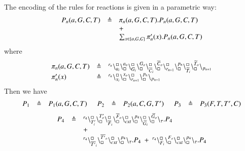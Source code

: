 The encoding of the rules for reactions is  given in a parametric way:
\[
\begin{array}{lcl}
P_n(a,G,C,T) & \triangleq &\pi_n(a,G,C,T).P_n(a,G,C,T)  \\
				&& +\\
			&&\sum_{x\in \{a,G,C\}} \pi'_n(x).P_n(a,G,C,T)
\end{array}
\]
where
\[
\begin{array}{lcl}
\pi_n(a,G,C,T) & \triangleq & {}^{r_n}\backslash_{a_i}^{\scriptstyle {\square}}\backslash_{\scriptstyle {\square}}^{a_o}
                                                    \backslash_{G_i}^{\scriptstyle {\square}}\backslash_{\scriptstyle {\square}}^{G_o}
                                                     \backslash_{\overline{C}_i}^{\scriptstyle {\square}}\backslash_{\scriptstyle {\square}}^{\overline{C}_o}
					        \backslash_{r_{n+1}}^{\scriptstyle {\square}}\backslash_{\scriptstyle {\square}}^{p_n}
					        \backslash_{\widetilde{T}_i}^{\scriptstyle {\square}}\backslash_{\scriptstyle {\square}}^{\widetilde{T}_o}
			\backslash_{p_{n+1}}\\
\pi'_n(x) &\triangleq &  {}^{r_n}\backslash_{x_i}^{\scriptstyle {\square}}\backslash_{\scriptstyle {\square}}^{x_o}\backslash_{r_{n+1}}^{\scriptstyle {\square}}\backslash_{\scriptstyle {\square}}^{p_n} \backslash_{p_{n+1}} 
\end{array}
\]
\noindent
Then we have 
\[
\begin{array}{lcl @{\hspace{0.5cm}}lcl @{\hspace{0.5cm}}lcl }
P_1 & \defeq & P_1(a,G,C,T) &   P_2 & \defeq & P_2(a,C,G,T') &   P_3 & \defeq & P_3(F,T,T',C)  \\
\end{array}
\]
\[
\begin{array}{lcl}
P_4 & \triangleq &{}^{r_4}\backslash_{T'_i}^{\scriptstyle {\square}}\backslash_{\scriptstyle {\square}}^{T'_o}
                                                     \backslash_{\overline{F}_i}^{\scriptstyle {\square}}\backslash_{\scriptstyle {\square}}^{\overline{F}_o}
					        \backslash_{\mathit{cxt}}^{\scriptstyle {\square}}\backslash_{\scriptstyle {\square}}^{p_4}
					        \backslash_{\widetilde{G}_i}^{\scriptstyle {\square}}\backslash_{\scriptstyle {\square}}^{\widetilde{G}_o}
			\backslash_{\tau}.P_4  \\
				&& +\\
&&{}^{r_4}\backslash_{\overline{T'}_i}^{\scriptstyle {\square}}\backslash_{\scriptstyle {\square}}^{\overline{T'}_o}\backslash_{cxt}^{\scriptstyle {\square}}\backslash_{\scriptstyle {\square}}^{p_4} \backslash_{\tau}.P_4 \ +\  {}^{r_4}\backslash_{F_i}^{\scriptstyle {\square}}\backslash_{\scriptstyle {\square}}^{F_o}\backslash_{\mathit{cxt}}^{\scriptstyle {\square}}\backslash_{\scriptstyle {\square}}^{p_4} \backslash_{\tau}.P_4
\end{array}
\]
\noindent

